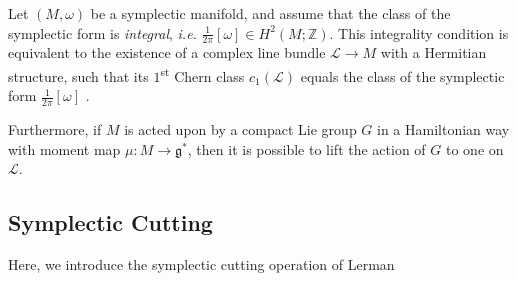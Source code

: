 \documentclass{amsart}
\newcommand{\ie}{\emph{i.e.} }
\newcommand{\ra}{\rightarrow}
\newcommand{\w}{\omega}
\newcommand{\ZZ}{\mathbb{Z}}
\newcommand{\mcL}{\mathcal{L}}
\newcommand{\mfg}{\mathfrak{g}}
\begin{document}
	Let $(M, \w)$ be a symplectic manifold, and assume that the class of the symplectic form is \emph{integral}, \ie $\tfrac{1}{2\pi}[\w] \in H^{2}(M; \ZZ)$. This integrality condition is equivalent to the existence of a complex line bundle $\mcL \ra M$ with a Hermitian structure, such that its $1$\textsuperscript{st} Chern class $c_{1}(\mcL)$ equals the class of the symplectic form $\tfrac{1}{2\pi}[\w]$ \cite{Duistermaat2011}.
	
	Furthermore, if $M$ is acted upon by a compact Lie group $G$ in a Hamiltonian way with moment map $\mu : M \ra \mfg^{\ast}$, then it is possible to lift the action of $G$ to one on $\mcL$. 

	\subsection{Symplectic Cutting}
	
	Here, we introduce the symplectic cutting operation of Lerman
	
\end{document}
